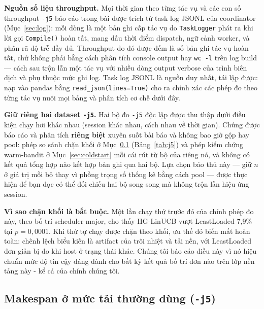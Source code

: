 \documentclass[final,5p,times,twocolumn]{elsarticle}
\begin{document}
\textbf{Nguồn số liệu throughput.} Mọi thời gian theo từng tác vụ và các con số throughput \texttt{-j5} báo cáo trong bài được trích từ task log JSONL của coordinator (Mục~\ref{sec:log}): mỗi dòng là một bản ghi cấp tác vụ do \texttt{TaskLogger} phát ra khi lời gọi \texttt{Compile()} hoàn tất, mang dấu thời điểm dispatch, ngữ cảnh worker, và phân rã độ trễ đầy đủ. Throughput do đó được đếm là số bản ghi tác vụ hoàn tất, chứ không phải bằng cách phân tích console output hay \texttt{wc -l} trên log build --- cách sau trộn lẫn một tác vụ với nhiều dòng output verbose của trình biên dịch và phụ thuộc mức ghi log. Task log JSONL là nguồn duy nhất, tái lập được: nạp vào pandas bằng \texttt{read\_json(lines=True)} cho ra chính xác các phép đo theo từng tác vụ nuôi mọi bảng và phân tích cơ chế dưới đây.

\textbf{Giữ riêng hai dataset \texttt{-j5}.} Hai bộ đo \texttt{-j5} độc lập được thu thập dưới điều kiện chạy hơi khác nhau (session khác nhau, cách nhau về thời gian). Chúng được báo cáo và phân tích \textbf{riêng biệt} xuyên suốt bài báo và không bao giờ gộp hay pool: phép so sánh chặn khối ở Mục~\ref{sec:j5} (Bảng~\ref{tab:j5}) và phép kiểm chứng warm-bandit ở Mục~\ref{sec:coldstart} mỗi cái rút từ bộ của riêng nó, và không có kết quả tổng hợp nào kết hợp bản ghi qua hai bộ. Lựa chọn bảo thủ này --- giữ $n$ ở giá trị mỗi bộ thay vì phồng trọng số thống kê bằng cách pool --- được thực hiện để bạn đọc có thể đối chiếu hai bộ song song mà không trộn lẫn hiệu ứng session.

\textbf{Vì sao chặn khối là bắt buộc.} Một lần chạy thử trước đó của chính phép đo này, theo bố trí scheduler-major, cho thấy HG-LinUCB vượt LeastLoaded 7,9\% tại $p=0{,}0001$. Khi thứ tự chạy được chặn theo khối, ưu thế đó biến mất hoàn toàn: chênh lệch biểu kiến là artifact của trôi nhiệt và tải nền, với LeastLoaded đơn giản bị đo khi host ở trạng thái khác. Chúng tôi báo cáo điều này vì nó hiệu chuẩn mức độ tin cậy đáng dành cho bất kỳ kết quả bố trí đơn nào trên lớp nền tảng này - kể cả của chính chúng tôi.

\subsection{Makespan ở mức tải thường dùng (\texttt{-j5})}
\label{sec:j5}
\end{document}

